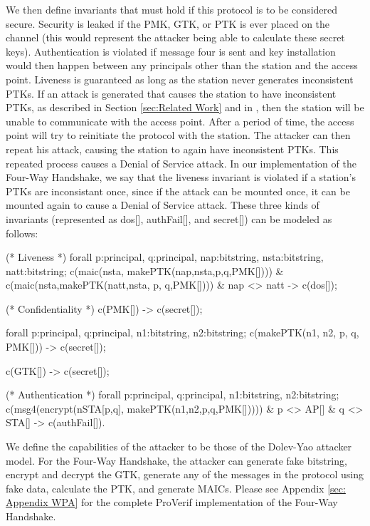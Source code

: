 \documentclass[11pt, twocolumn]{article} %
\begin{document}
{We then define invariants that must hold if this protocol is to be considered secure.  Security is leaked if the PMK, GTK, or PTK is ever placed on the channel (this would represent the attacker being able to calculate these secret keys).  Authentication is violated if message four is sent and key installation would then happen between any principals other than the station and the access point.  Liveness is guaranteed as long as the station never generates inconsistent PTKs.  If an attack is generated that causes the station to have inconsistent PTKs, as described in Section \ref{sec:Related Work} and in \cite{he04}, then the station will be unable to communicate with the access point.  After a period of time, the access point will try to reinitiate the protocol with the station.  The attacker can then repeat his attack, causing the station to again have inconsistent PTKs.  This repeated process causes a Denial of Service attack.  In our implementation of the Four-Way Handshake, we say that the liveness invariant is violated if a station's PTKs are inconsistant once, since if the attack can be mounted once, it can be mounted again to cause a Denial of Service attack.  These three kinds of invariants (represented as dos[], authFail[], and secret[]) can be modeled as follows:

\begin{verbatimtab}[3]
(* Liveness *)
forall p:principal, q:principal, 
	nap:bitstring, nsta:bitstring, 
		natt:bitstring; c(maic(nsta,
			makePTK(nap,nsta,p,q,PMK[]))) & 
				c(maic(nsta,makePTK(natt,nsta,
					p, q,PMK[]))) & 
						nap <> natt -> c(dos[]); 

(* Confidentiality *)
c(PMK[]) -> c(secret[]);

forall p:principal, q:principal, 
	n1:bitstring, n2:bitstring; 
		c(makePTK(n1, n2, p, q, PMK[])) 
			-> c(secret[]); 

c(GTK[]) -> c(secret[]);

(* Authentication *)
forall p:principal, q:principal, 
	n1:bitstring, n2:bitstring; 
		c(msg4(encrypt(nSTA[p,q],
			makePTK(n1,n2,p,q,PMK[])))) 
				& p <> AP[] & 
					q <> STA[] -> c(authFail[]).
\end{verbatimtab}

We define the capabilities of the attacker to be those of the Dolev-Yao attacker model.  For the Four-Way Handshake, the attacker can generate fake bitstring, encrypt and decrypt the GTK, generate any of the messages in the protocol using fake data, calculate the PTK, and generate MAICs.  Please see Appendix \ref{sec: Appendix WPA} for the complete ProVerif implementation of the Four-Way Handshake.

}
\end{document}
